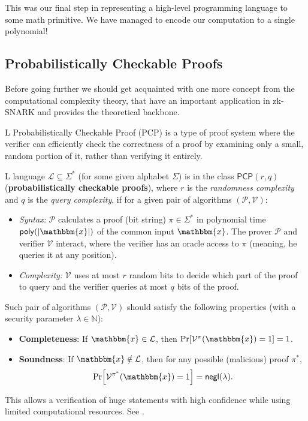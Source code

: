 \documentclass[../lecture-notes-148x210.tex]{subfiles}
\begin{document}
This was our final step in representing a high-level programming language to some math primitive.
We have managed to encode our computation to a single polynomial!

\subsection{Probabilistically Checkable Proofs}

Before going further we should get acquainted with one more concept from the computational 
complexity theory, that have an important application in zk-SNARK and provides the theoretical 
backbone. 

L Probabilistically Checkable Proof (PCP) is a type of proof system where the verifier can 
efficiently check the correctness of a proof by examining only a small, random portion of it, rather
than verifying it entirely. 
\begin{definition}
    L language $\mathcal{L} \subseteq \Sigma^*$ (for some given alphabet
    $\Sigma$) is in the class $\mathsf{PCP}(r,q)$ (\textbf{probabilistically
    checkable proofs}), where $r$ is the \emph{randomness complexity} and $q$ is
    the \emph{query complexity}, if for a given pair of algorithms
    $(\mathcal{P}, \mathcal{V})$: 
    \begin{itemize}
        \item \emph{Syntax:} $\mathcal{P}$ calculates a proof (bit string) $\pi
        \in \Sigma^*$ in polynomial time $\mathsf{poly}(|\mathbbm{x}|)$ of the
        common input $\mathbbm{x}$. The prover $\mathcal{P}$ and verifier
        $\mathcal{V}$ interact, where the verifier has an oracle access to $\pi$
        (meaning, he queries it at any position).
        \item \emph{Complexity:} $\mathcal{V}$ uses at most $r$ random bits to
        decide which part of the proof to query and the verifier queries at most
        $q$ bits of the proof.
    \end{itemize}
    
    Such pair of algorithms $(\mathcal{P}, \mathcal{V})$ should satisfy the
    following properties (with a security parameter $\lambda \in \mathbb{N}$):
    \begin{itemize}
        \item \textbf{Completeness}: If $\mathbbm{x} \in \mathcal{L}$, then $\Pr[\mathcal{V}^{\pi}(\mathbbm{x}) = 1] = 1$.
        \item \textbf{Soundness}: If $\mathbbm{x} \notin \mathcal{L}$, then for
        any possible (malicious) proof $\pi^*$, 
        \begin{equation*}
            \Pr[\mathcal{V}^{\pi^*}(\mathbbm{x}) = 1] = \mathsf{negl}(\lambda).
        \end{equation*}
    \end{itemize}
\end{definition}
This allows a verification of huge statements with high confidence while using
limited computational resources. See .
\end{document}
